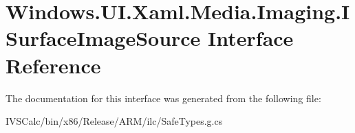 \hypertarget{interface_windows_1_1_u_i_1_1_xaml_1_1_media_1_1_imaging_1_1_i_surface_image_source}{}\section{Windows.\+U\+I.\+Xaml.\+Media.\+Imaging.\+I\+Surface\+Image\+Source Interface Reference}
\label{interface_windows_1_1_u_i_1_1_xaml_1_1_media_1_1_imaging_1_1_i_surface_image_source}


The documentation for this interface was generated from the following file\+:\begin{DoxyCompactItemize}
\item 
I\+V\+S\+Calc/bin/x86/\+Release/\+A\+R\+M/ilc/Safe\+Types.\+g.\+cs\end{DoxyCompactItemize}
